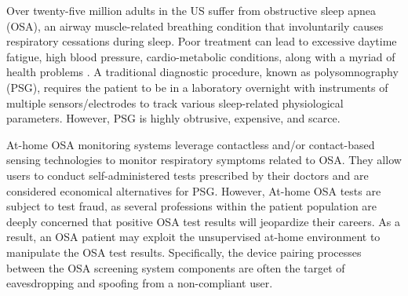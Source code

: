 Over twenty-five million adults in the US suffer from obstructive sleep apnea (OSA), an airway muscle-related breathing condition that involuntarily causes respiratory cessations during sleep. Poor treatment can lead to excessive daytime fatigue, high blood pressure, cardio-metabolic conditions, along with a myriad of health problems \cite{baboli_good_2015}. A traditional diagnostic procedure, known as polysomnography (PSG), requires the patient to be in a laboratory overnight with instruments of multiple sensors/electrodes to track various sleep-related physiological parameters. However, PSG is highly obtrusive, expensive, and scarce.

At-home OSA monitoring systems leverage contactless and/or contact-based sensing technologies to monitor respiratory symptoms related to OSA. They allow users to conduct self-administered tests prescribed by their doctors and are considered economical alternatives for PSG. However, At-home OSA tests are subject to test fraud, as several professions within the patient population are deeply concerned that positive OSA test results will jeopardize their careers. As a result, an OSA patient may exploit the unsupervised at-home environment to manipulate the OSA test results. Specifically, the device pairing processes between the OSA screening system components are often the target of eavesdropping and spoofing from a non-compliant user.  





